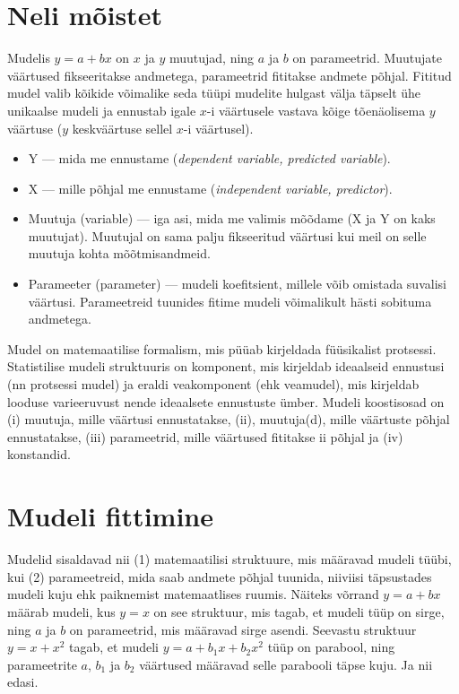 \documentclass[]{book}
\begin{document}
\section{Neli mõistet}\label{neli-moistet}

Mudelis \(y = a + bx\) on \(x\) ja \(y\) muutujad, ning \(a\) ja \(b\)
on parameetrid. Muutujate väärtused fikseeritakse andmetega, parameetrid
fititakse andmete põhjal. Fititud mudel valib kõikide võimalike seda
tüüpi mudelite hulgast välja täpselt ühe unikaalse mudeli ja ennustab
igale \(x\)-i väärtusele vastava kõige tõenäolisema \(y\) väärtuse
(\(y\) keskväärtuse sellel \(x\)-i väärtusel).

\begin{itemize}
\item
  Y --- mida me ennustame (\emph{dependent variable, predicted
  variable}).
\item
  X --- mille põhjal me ennustame (\emph{independent variable,
  predictor}).
\item
  Muutuja (variable) --- iga asi, mida me valimis mõõdame (X ja Y on
  kaks muutujat). Muutujal on sama palju fikseeritud väärtusi kui meil
  on selle muutuja kohta mõõtmisandmeid.
\item
  Parameeter (parameter) --- mudeli koefitsient, millele võib omistada
  suvalisi väärtusi. Parameetreid tuunides fitime mudeli võimalikult
  hästi sobituma andmetega.
\end{itemize}

Mudel on matemaatilise formalism, mis püüab kirjeldada füüsikalist
protsessi. Statistilise mudeli struktuuris on komponent, mis kirjeldab
ideaalseid ennustusi (nn protsessi mudel) ja eraldi veakomponent (ehk
veamudel), mis kirjeldab looduse varieeruvust nende ideaalsete
ennustuste ümber. Mudeli koostisosad on (i) muutuja, mille väärtusi
ennustatakse, (ii), muutuja(d), mille väärtuste põhjal ennustatakse,
(iii) parameetrid, mille väärtused fititakse ii põhjal ja (iv)
konstandid.

\section{Mudeli fittimine}\label{mudeli-fittimine}

Mudelid sisaldavad nii (1) matemaatilisi struktuure, mis määravad mudeli
tüübi, kui (2) parameetreid, mida saab andmete põhjal tuunida, niiviisi
täpsustades mudeli kuju ehk paiknemist matemaatlises ruumis. Näiteks
võrrand \(y = a + bx\) määrab mudeli, kus \(y = x\) on see struktuur,
mis tagab, et mudeli tüüp on sirge, ning \(a\) ja \(b\) on parameetrid,
mis määravad sirge asendi. Seevastu struktuur \(y = x + x^2\) tagab, et
mudeli \(y = a + b_1x + b_2x^2\) tüüp on parabool, ning parameetrite
\(a\), \(b_1\) ja \(b_2\) väärtused määravad selle parabooli täpse kuju.
Ja nii edasi.
\end{document}
